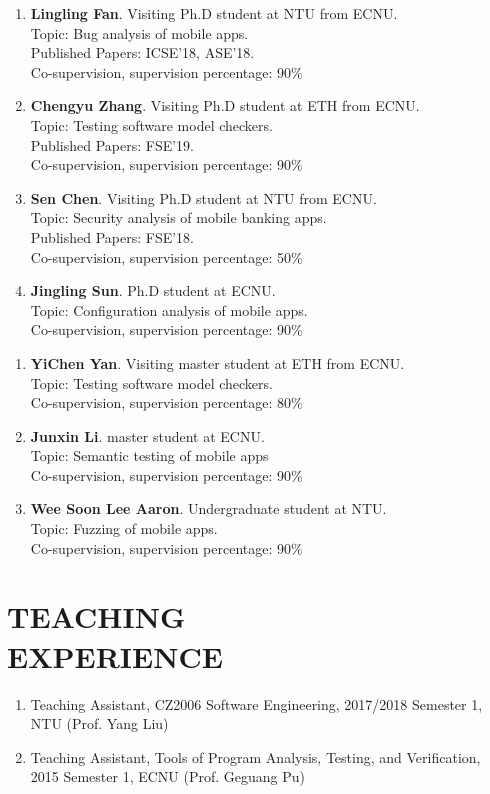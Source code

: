 \documentclass[margin]{res}
\begin{document}
\begin{resume}
\begin{enumerate}[leftmargin=*]
    \item \textbf{Lingling Fan}. Visiting Ph.D student at NTU from ECNU. \\Topic: Bug analysis of mobile apps. \\Published Papers: ICSE'18, ASE'18. \\Co-supervision, supervision percentage: 90\%
    \item \textbf{Chengyu Zhang}. Visiting Ph.D student at ETH from ECNU. \\Topic: Testing software model checkers. \\Published Papers: FSE'19. \\Co-supervision, supervision percentage: 90\%
    \item \textbf{Sen Chen}. Visiting Ph.D student at NTU from ECNU. \\Topic: Security analysis of mobile banking apps. \\Published Papers: FSE'18. \\Co-supervision, supervision percentage: 50\%
    \item \textbf{Jingling Sun}. Ph.D student at ECNU. \\Topic: Configuration analysis of mobile apps. \\Co-supervision, supervision percentage: 90\%
\end{enumerate}
\begin{enumerate}[leftmargin=*]
    \item \textbf{YiChen Yan}. Visiting master student at ETH from ECNU. \\Topic: Testing software model checkers. \\Co-supervision, supervision percentage: 80\%
    \item \textbf{Junxin Li}. master student at ECNU. \\Topic: Semantic testing of mobile apps \\Co-supervision, supervision percentage: 90\%
    \item \textbf{Wee Soon Lee Aaron}. Undergraduate student at NTU. \\Topic: Fuzzing of mobile apps.  \\Co-supervision, supervision percentage: 90\%
\end{enumerate}

\section{TEACHING\\EXPERIENCE}
\begin{enumerate}[leftmargin=*]
    \item Teaching Assistant, CZ2006 Software Engineering, 2017/2018 Semester 1, NTU (Prof. Yang Liu)
    \item Teaching Assistant, Tools of Program Analysis, Testing, and Verification, 2015 Semester 1, ECNU (Prof. Geguang Pu)
\end{enumerate}



\end{resume}
\end{document}
